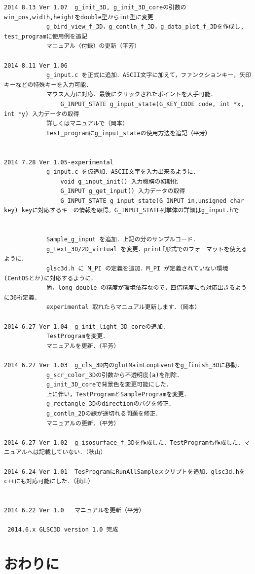 \documentclass[a4paper,12pt]{jsarticle}%
\begin{document}
\begin{verbatim}
2014 8.13 Ver 1.07	g_init_3D, g_init_3D_coreの引数のwin_pos,width,heightをdouble型からint型に変更
			g_bird_view_f_3D，g_contln_f_3D，g_data_plot_f_3Dを作成し, test_programに使用例を追記
			マニュアル（付録）の更新（平芳）

2014 8.11 Ver 1.06
			g_input.c を正式に追加．ASCII文字に加えて，ファンクションキー，矢印キーなどの特殊キーを入力可能．
			マウス入力に対応．最後にクリックされたポイントを入手可能．
				G_INPUT_STATE g_input_state(G_KEY_CODE code, int *x, int *y) 入力データの取得
			詳しくはマニュアルで（岡本）
			test_programにg_input_stateの使用方法を追記（平芳）


2014 7.28 Ver 1.05-experimental
			g_input.c を仮追加．ASCII文字を入力出来るように．
				void g_input_init() 入力機構の初期化
				G_INPUT g_get_input() 入力データの取得
				G_INPUT_STATE g_input_state(G_INPUT in,unsigned char key) keyに対応するキーの情報を取得。G_INPUT_STATE列挙体の詳細はg_input.hで


			Sample_g_input を追加．上記の分のサンプルコード．
			g_text_3D/2D_virtual を変更．printf形式でのフォーマットを使えるように．
			glsc3d.h に M_PI の定義を追加．M_PI が定義されていない環境(CentOSとか)に対応するように．
			尚，long double の精度が環境依存なので，四倍精度にも対応出きるように36桁定義．
			experimental 取れたらマニュアル更新します．（岡本）

2014 6.27 Ver 1.04	g_init_light_3D_coreの追加．
			TestProgramを変更．
			マニュアルを更新．（平芳）

2014 6.27 Ver 1.03	g_cls_3D内のglutMainLoopEventをg_finish_3Dに移動．
			g_scr_color_3Dの引数から不透明度(a)を削除．
			g_init_3D_coreで背景色を変更可能にした．
			上に伴い，TestProgramとSampleProgramを変更．
			g_rectangle_3Dのdirectionのバグを修正．
			g_contln_2Dの線が途切れる問題を修正．
			マニュアルの更新．（平芳）

2014 6.27 Ver 1.02 	g_isosurface_f_3Dを作成した．TestProgramも作成した．マニュアルへは記載していない．（秋山）

2014 6.24 Ver 1.01 	TesProgramにRunAllSampleスクリプトを追加．glsc3d.hをc++にも対応可能にした．（秋山）


2014 6.22 Ver 1.0 	マニュアルを更新（平芳）

 2014.6.x GLSC3D version 1.0 完成
\end{verbatim}
\newpage
\section{おわりに}
\end{document}
